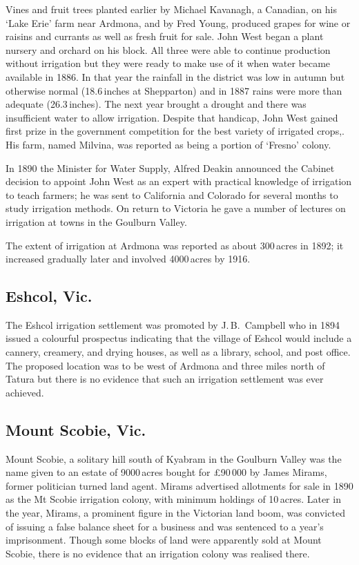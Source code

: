 Vines and fruit trees planted earlier by Michael Kavanagh, a Canadian,
on his `Lake Erie' farm near Ardmona, and by Fred Young, produced
grapes for wine or raisins and currants as well as fresh fruit for
sale.  John West began a plant nursery and orchard on his block.  All
three were able to continue production without irrigation but they
were ready to make use of it when water became available in 1886.  In
that year the rainfall in the district was low in autumn but otherwise
normal (18.6\,inches at Shepparton) and in 1887 rains were more than
adequate (26.3\,inches).  The next year brought a drought and there
was insufficient water to allow irrigation.  Despite that handicap,
John West gained first prize in the government competition for the
best variety of irrigated crops,. His farm, named Milvina, was
reported as being a portion of `Fresno'
colony.

In 1890 the Minister for Water Supply, Alfred Deakin announced the
Cabinet decision to appoint John West as an expert with practical
knowledge of irrigation to teach farmers; he was sent to California
and Colorado for several months to study irrigation methods. On return
to Victoria he gave a number of lectures on irrigation at towns in the
Goulburn Valley.

The extent of irrigation at Ardmona was reported as about 300\,acres in
1892; it increased gradually later and involved 4000\,acres by
1916.

\subsection*{Eshcol, Vic.}

The Eshcol irrigation settlement was promoted by J.\,B.~Campbell who
in 1894 issued a colourful prospectus indicating that the village of
Esh\-col would include a cannery, creamery, and drying houses, as well
as a library, school, and post office.  The proposed location was to
be west of Ardmona and three miles north of Tatura but there is no
evidence that such an irrigation settlement was ever
achieved.

\subsection*{Mount Scobie, Vic.}

Mount Scobie, a solitary hill south of Kyabram in the Goulburn Valley
was the name given to an estate of 9000\,acres bought for \pounds90\,000
by James Mirams, former politician turned land agent.  Mirams
advertised allotments for sale in 1890 as the Mt Scobie irrigation
colony, with minimum holdings of 10\,acres.  Later in the year, Mirams, a
prominent figure in the Victorian land boom, was convicted of issuing
a false balance sheet for a business and was sentenced to a year's
imprisonment.  Though some blocks of land were apparently sold at
Mount Scobie, there is no evidence that an irrigation colony was
realised there.\fn{\citet[p.\,150]{cannon1972}; \textsl{Australasian},
1 Mar.\ 1890; \citet{ingham1974b}.}

